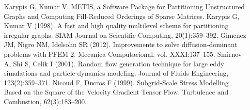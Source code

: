  Karypis G, Kumar V. METIS, a Software Package for Partitioning Unstructured Graphs and Computing Fill-Reduced Orderings of Sparse Matrices.
 Karypis G, Kumar V (1998). A fast and high quality multilevel scheme for partitioning irregular graphs. SIAM Journal on Scientific Computing, 20(1):359--392.
 Gimenez JM, Nigro NM, Idelsohn SR (2012). Improvements to solve diffusion-dominant problems with PFEM-2. Mecanica Computacional, vol. XXXI:137--155.
 Smirnov A, Shi S, Celik I (2001). Random flow generation technique for large eddy simulations and particle-dynamics modeling. Journal of Fluids Engineering, 123(2):359--371.
 Nicoud F, Ducros F (1999). Subgrid-Scale Stress Modelling Based on the Square of the Velocity Gradient Tensor Flow. Turbulence and Combustion, 62(3):183--200.
